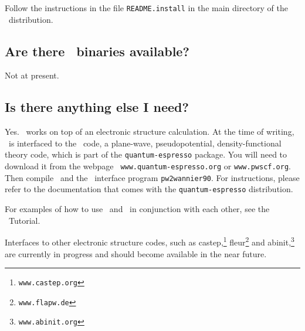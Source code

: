 Follow the instructions in the file {\tt README.install} in the main
directory of the \wannier\ distribution.

\subsection{Are there \wannier\ binaries available?}

Not at present.

\subsection{Is there anything else I need?}

Yes. \wannier\ works on top of an electronic structure
calculation. At the time of writing, \wannier\ is interfaced to the
\pwscf\ code, a plane-wave, pseudopotential, density-functional theory
code, which is part of the {\tt quantum-espresso} package. You 
will need to download it from the webpage {\tt
  www.quantum-espresso.org} or {\tt www.pwscf.org}. Then compile \pwscf\
and the \wannier\ interface program {\tt pw2wannier90}. For
instructions, please refer to the
documentation that comes with the {\tt quantum-espresso} distribution.

For examples of how to use \pwscf\ and \wannier\ in conjunction with
each other, see the \wannier\ Tutorial.

Interfaces to other electronic structure codes, such as {\sc
  castep},\footnote{{\tt www.castep.org}}
{\sc fleur}\footnote{{\tt www.flapw.de}} and {\sc
  abinit},\footnote{{\tt www.abinit.org}} are currently in
progress and should become available in the near future. 



